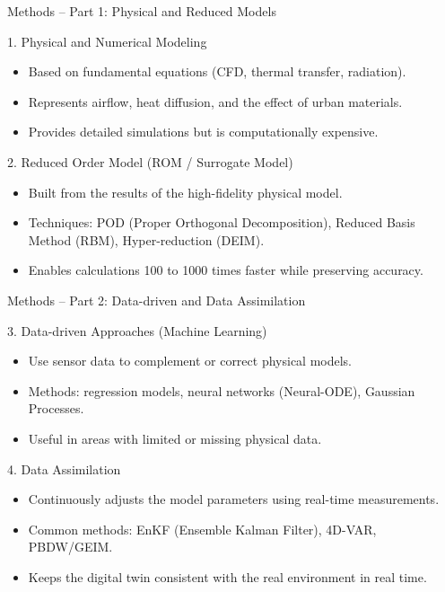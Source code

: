 \documentclass{beamer}
\begin{document}
\begin{frame}{Methods – Part 1: Physical and Reduced Models}
\small
\begin{block}{1. Physical and Numerical Modeling}
\begin{itemize}
    \item Based on fundamental equations (CFD, thermal transfer, radiation).
    \item Represents airflow, heat diffusion, and the effect of urban materials.
    \item Provides detailed simulations but is computationally expensive.
\end{itemize}
\end{block}

\begin{block}{2. Reduced Order Model (ROM / Surrogate Model)}
\begin{itemize}
    \item Built from the results of the high-fidelity physical model.
    \item Techniques: POD (Proper Orthogonal Decomposition), Reduced Basis Method (RBM), Hyper-reduction (DEIM).
    \item Enables calculations 100 to 1000 times faster while preserving accuracy.
\end{itemize}
\end{block}
\end{frame}


\begin{frame}{Methods – Part 2: Data-driven and Data Assimilation}
\small
\begin{block}{3. Data-driven Approaches (Machine Learning)}
\begin{itemize}
    \item Use sensor data to complement or correct physical models.
    \item Methods: regression models, neural networks (Neural-ODE), Gaussian Processes.
    \item Useful in areas with limited or missing physical data.
\end{itemize}
\end{block}

\begin{block}{4. Data Assimilation}
\begin{itemize}
    \item Continuously adjusts the model parameters using real-time measurements.
    \item Common methods: EnKF (Ensemble Kalman Filter), 4D-VAR, PBDW/GEIM.
    \item Keeps the digital twin consistent with the real environment in real time.
\end{itemize}
\end{block}
\end{frame}
\end{document}
